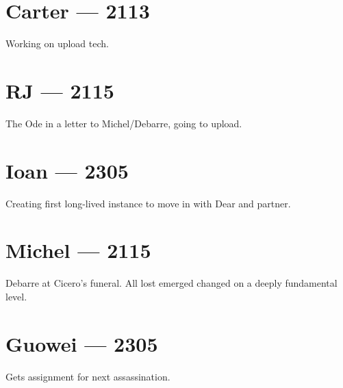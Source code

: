 \chapter*{Carter — 2113}

Working on upload tech.

\chapter*{RJ — 2115}

The Ode in a letter to Michel/Debarre, going to upload.

\chapter*{Ioan — 2305}

Creating first long-lived instance to move in with Dear and partner.

\chapter*{Michel — 2115}

Debarre at Cicero's funeral. All lost emerged changed on a deeply fundamental level.

\chapter*{Guowei — 2305}

Gets assignment for next assassination.
